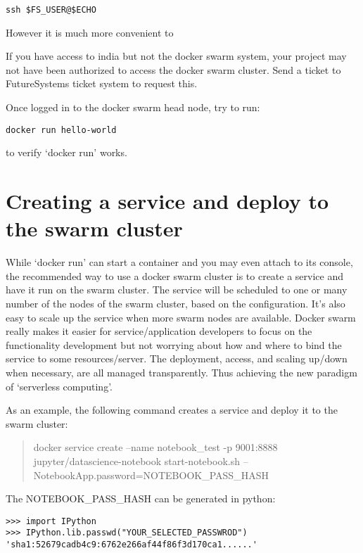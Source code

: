 \begin{verbatim}
ssh $FS_USER@$ECHO
\end{verbatim}

However it is much more convenient to 

\begin{NOTE}
If you have access to india but not the docker swarm
system, your project may not have been authorized to access the docker
swarm cluster. Send a ticket to FutureSystems ticket system to request
this.
\end{NOTE}

Once logged in to the docker swarm head node, try to run:

\begin{verbatim}
docker run hello-world
\end{verbatim}

to verify `docker run' works.

\section{Creating a service and deploy to the swarm
cluster}\label{creating-a-service-and-deploy-to-the-swarm-cluster}

While `docker run' can start a container and you may even attach to its
console, the recommended way to use a docker swarm cluster is to create
a service and have it run on the swarm cluster. The service will be
scheduled to one or many number of the nodes of the swarm cluster, based
on the configuration. It's also easy to scale up the service when more
swarm nodes are available. Docker swarm really makes it easier for
service/application developers to focus on the functionality development
but not worrying about how and where to bind the service to some
resources/server. The deployment, access, and scaling up/down when
necessary, are all managed transparently. Thus achieving the new
paradigm of `serverless computing'.

As an example, the following command creates a service and deploy it to
the swarm cluster:

\begin{quote}
docker service create --name notebook\_test -p 9001:8888
jupyter/datascience-notebook start-notebook.sh
--NotebookApp.password=NOTEBOOK\_PASS\_HASH
\end{quote}

The NOTEBOOK\_PASS\_HASH can be generated in python:

\begin{verbatim}
>>> import IPython
>>> IPython.lib.passwd("YOUR_SELECTED_PASSWROD")
'sha1:52679cadb4c9:6762e266af44f86f3d170ca1......'
\end{verbatim}

